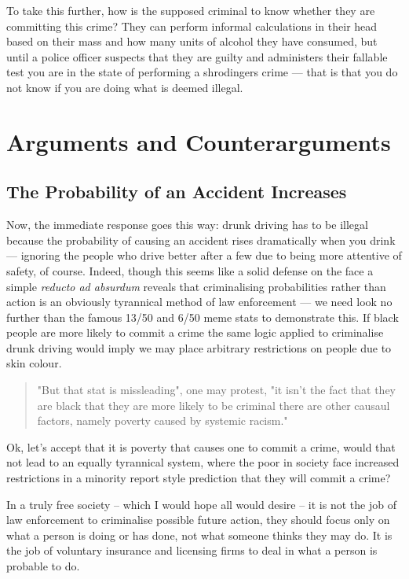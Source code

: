 \documentclass[11pt]{article}
\begin{document}
To take this further, how is the supposed criminal to know whether they are committing this crime? They can perform informal calculations in their head based on their mass and how many units of alcohol they have consumed, but until a police officer suspects that they are guilty and administers their fallable test you are in the state of performing a shrodingers crime --- that is that you do not know if you are doing what is deemed illegal.


\section{Arguments and Counterarguments}
\label{sec:orgc672258}

\subsection{The Probability of an Accident Increases}
\label{sec:org1afc9b2}

Now, the immediate response goes this way: drunk driving has to be illegal because the probability of causing an accident rises dramatically when you drink --- ignoring the people who drive better after a few due to being more attentive of safety, of course. Indeed, though this seems like a solid defense on the face a simple \emph{reducto ad absurdum} reveals that criminalising probabilities rather than action is an obviously tyrannical method of law enforcement --- we need look no further than the famous 13/50 and 6/50 meme stats to demonstrate this. If black people are more likely to commit a crime the same logic applied to criminalise drunk driving would imply we may place arbitrary restrictions on people due to skin colour.

\begin{quote}
"But that stat is missleading", one may protest, "it isn't the fact that they are black that they are more likely to be criminal there are other causaul factors, namely poverty caused by systemic racism."
\end{quote}

Ok, let's accept that it is poverty that causes one to commit a crime, would that not lead to an equally tyrannical system, where the poor in society face increased restrictions in a minority report style prediction that they will commit a crime?

In a truly free society -- which I would hope all would desire -- it is not the job of law enforcement to criminalise possible future action, they should focus only on what a person is doing or has done, not what someone thinks they may do. It is the job of voluntary insurance and licensing firms to deal in what a person is probable to do.
\end{document}
